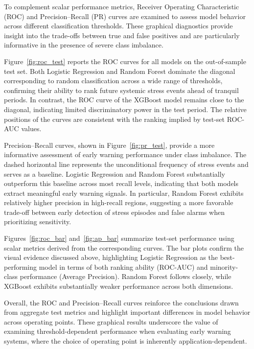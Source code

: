 \documentclass[11pt,a4paper]{article}
\begin{document}
To complement scalar performance metrics, Receiver Operating Characteristic (ROC) and Precision--Recall (PR) curves are examined to assess model behavior across different classification thresholds. These graphical diagnostics provide insight into the trade-offs between true and false positives and are particularly informative in the presence of severe class imbalance.

Figure~\ref{fig:roc_test} reports the ROC curves for all models on the out-of-sample test set. Both Logistic Regression and Random Forest dominate the diagonal corresponding to random classification across a wide range of thresholds, confirming their ability to rank future systemic stress events ahead of tranquil periods. In contrast, the ROC curve of the XGBoost model remains close to the diagonal, indicating limited discriminatory power in the test period. The relative positions of the curves are consistent with the ranking implied by test-set ROC-AUC values.

Precision--Recall curves, shown in Figure~\ref{fig:pr_test}, provide a more informative assessment of early warning performance under class imbalance. The dashed horizontal line represents the unconditional frequency of stress events and serves as a baseline. Logistic Regression and Random Forest substantially outperform this baseline across most recall levels, indicating that both models extract meaningful early warning signals. In particular, Random Forest exhibits relatively higher precision in high-recall regions, suggesting a more favorable trade-off between early detection of stress episodes and false alarms when prioritizing sensitivity.

Figures~\ref{fig:roc_bar} and~\ref{fig:ap_bar} summarize test-set performance using scalar metrics derived from the corresponding curves. The bar plots confirm the visual evidence discussed above, highlighting Logistic Regression as the best-performing model in terms of both ranking ability (ROC-AUC) and minority-class performance (Average Precision). Random Forest follows closely, while XGBoost exhibits substantially weaker performance across both dimensions.

Overall, the ROC and Precision--Recall curves reinforce the conclusions drawn from aggregate test metrics and highlight important differences in model behavior across operating points. These graphical results underscore the value of examining threshold-dependent performance when evaluating early warning systems, where the choice of operating point is inherently application-dependent.
\end{document}
